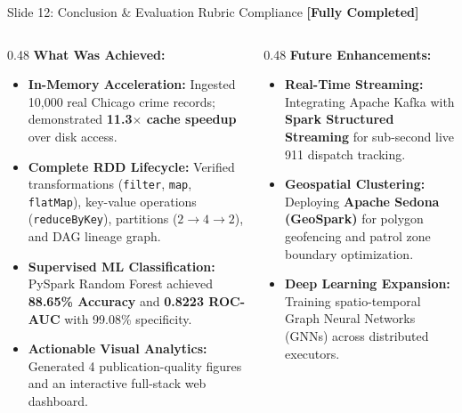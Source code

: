 \documentclass[aspectratio=169]{beamer}
\begin{document}
\begin{frame}{Slide 12: Conclusion \& Evaluation Rubric Compliance \hfill \footnotesize\color{AmritaMaroon}\textbf{[Fully Completed]}}
    \begin{columns}[T]
        \begin{column}{0.48\textwidth}
            \textbf{\textcolor{NavyBlue}{What Was Achieved:}}
            \begin{itemize}\tiny
                \setlength{\itemsep}{2pt}
                \item \textbf{In-Memory Acceleration:} Ingested 10,000 real Chicago crime records; demonstrated \textbf{11.3$\times$ cache speedup} over disk access.
                \item \textbf{Complete RDD Lifecycle:} Verified transformations (\texttt{filter}, \texttt{map}, \texttt{flatMap}), key-value operations (\texttt{reduceByKey}), partitions ($2\to4\to2$), and DAG lineage graph.
                \item \textbf{Supervised ML Classification:} PySpark Random Forest achieved \textbf{88.65\% Accuracy} and \textbf{0.8223 ROC-AUC} with 99.08\% specificity.
                \item \textbf{Actionable Visual Analytics:} Generated 4 publication-quality figures and an interactive full-stack web dashboard.
            \end{itemize}
        \end{column}
        \begin{column}{0.48\textwidth}
            \textbf{\textcolor{NavyBlue}{Future Enhancements:}}
            \begin{itemize}\tiny
                \setlength{\itemsep}{2pt}
                \item \textbf{Real-Time Streaming:} Integrating Apache Kafka with \textbf{Spark Structured Streaming} for sub-second live 911 dispatch tracking.
                \item \textbf{Geospatial Clustering:} Deploying \textbf{Apache Sedona (GeoSpark)} for polygon geofencing and patrol zone boundary optimization.
                \item \textbf{Deep Learning Expansion:} Training spatio-temporal Graph Neural Networks (GNNs) across distributed executors.
            \end{itemize}

\end{column}
\end{columns}
\end{frame}
\end{document}
